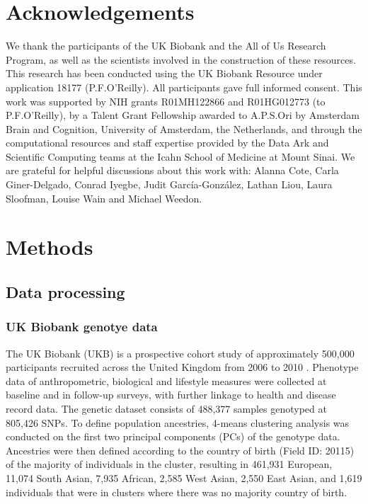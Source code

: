 \documentclass[12pt]{zHenriquesLab-StyleBioRxiv}
\begin{document}
{{\section*{Acknowledgements}
We thank the participants of the UK Biobank and the All of Us Research Program, as well as the scientists involved in
the construction of these resources. This research has been conducted using
the UK Biobank Resource under application 18177 (P.F.O’Reilly). All participants gave full informed consent. This work was supported by NIH grants R01MH122866 and R01HG012773 (to P.F.O'Reilly), by a Talent Grant Fellowship awarded to A.P.S.Ori by Amsterdam Brain and Cognition, University of Amsterdam, the Netherlands, and through the computational resources and staff expertise provided by the Data Ark and Scientific Computing teams at the Icahn School of Medicine at Mount Sinai. We are grateful for helpful discussions about this work with: Alanna Cote, Carla Giner-Delgado, Conrad Iyegbe, Judit García-González, Lathan Liou, Laura Sloofman, Louise Wain and Michael Weedon.


\clearpage \newpage 
\section*{Methods} \label{sec:methods} 
\subsection*{Data processing} \label{sec:methods:dataProcessing}
\subsubsection*{UK Biobank genotye data} 
The UK Biobank (UKB) is a prospective cohort study of approximately
500,000 participants recruited across the United Kingdom from 2006 to
2010 \cite{ukb}. Phenotype data of anthropometric, biological and
lifestyle measures were collected at baseline and in follow-up surveys, with
further linkage to health and disease record data. The genetic dataset
consists of 488,377 samples genotyped at 805,426 SNPs.
To define population ancestries, 4-means clustering analysis was
conducted on the first two principal components (PCs) of the genotype
data. Ancestries were then defined according to the country of 
birth (Field ID: 20115) of the majority of individuals in the cluster, resulting in 
461,931 European, 11,074 South Asian, 7,935 African, 2,585 West Asian, 
2,550 East Asian, and 1,619 individuals that were in clusters where there was 
no majority country of birth.

}}
\end{document}
